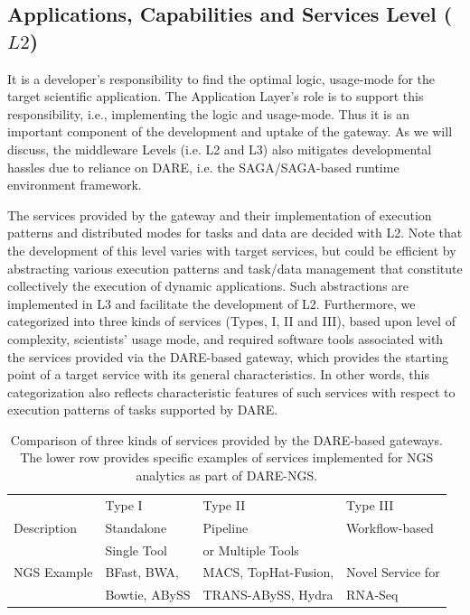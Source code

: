 \documentclass[]{svjour3}
\begin{document}
\subsection{Applications, Capabilities and Services Level ($L2$)}

It is a developer's responsibility to find the optimal logic,
usage-mode for the target scientific application. The Application
Layer's role is to support this responsibility, i.e., implementing the
logic and usage-mode. Thus it is an important component of the
development and uptake of the gateway. As we will discuss, the
middleware Levels (i.e. L2 and L3) also mitigates developmental
hassles due to reliance on DARE, i.e. the SAGA/SAGA-based runtime
environment framework.

The services provided by the gateway and their implementation of
execution patterns and distributed modes for tasks and data are
decided with L2. Note that the development of this level varies with
target services, but could be efficient by abstracting various
execution patterns and task/data management that constitute
collectively the execution of dynamic applications. Such abstractions
are implemented in L3 and facilitate the development of
L2. Furthermore, we categorized into three kinds of services (Types,
I, II and III), based upon level of complexity, scientists' usage
mode, and required software tools associated with the services
provided via the DARE-based gateway, which provides the starting point
of a target service with its general characteristics. In other words,
this categorization also reflects characteristic features of such
services with respect to execution patterns of tasks supported by
DARE.

\begin{table}[!h]
\centering
\begin{tabular}{| l | l | l | l |} \hline \rowcolor[rgb]{0.8,0.8,0.8} &
Type I & Type II & Type III \\ Description & Standalone  & Pipeline & Workflow-based \\ 
& Single Tool  & or Multiple Tools &  \\\hline 
NGS Example & BFast, BWA,  & MACS, TopHat-Fusion,  &   Novel Service for 
 \\
 &  Bowtie, ABySS  & TRANS-ABySS, Hydra & RNA-Seq \\
\hline
\end{tabular}
\caption{Comparison of three kinds of services provided by the
  DARE-based gateways. The lower row provides specific examples of
  services  implemented for NGS analytics as part of DARE-NGS.}
\label{table:three-type-service}
\end{table}
\end{document}
